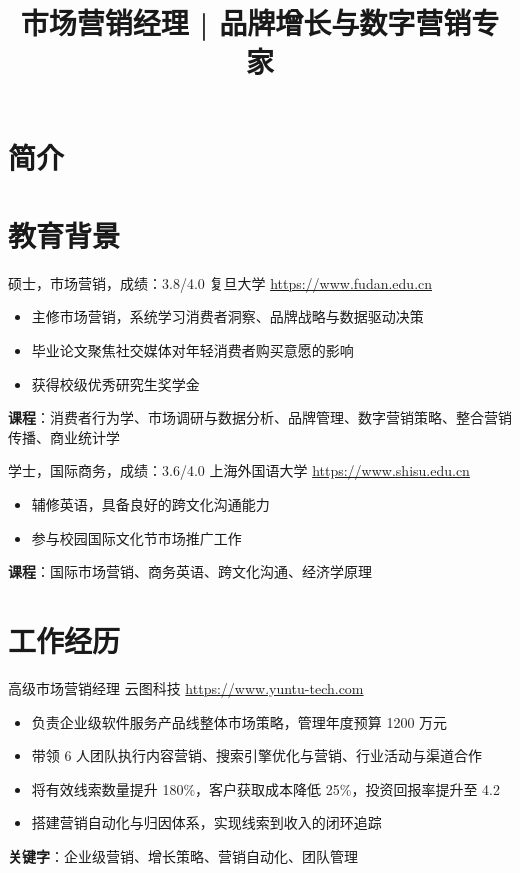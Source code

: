 \documentclass[a4paper, serif, 10pt]{moderncv}
\title{市场营销经理 | 品牌增长与数字营销专家}
\begin{document}
\maketitle

\section{简介}

\section{教育背景}

        {硕士，市场营销，成绩：3.8/4.0}
        {复旦大学}
        {\url{https://www.fudan.edu.cn}}
        {}
        {\begin{itemize}
\item 主修市场营销，系统学习消费者洞察、品牌战略与数据驱动决策
\item 毕业论文聚焦社交媒体对年轻消费者购买意愿的影响
\item 获得校级优秀研究生奖学金
\end{itemize}
\textbf{课程}：消费者行为学、市场调研与数据分析、品牌管理、数字营销策略、整合营销传播、商业统计学}

        {学士，国际商务，成绩：3.6/4.0}
        {上海外国语大学}
        {\url{https://www.shisu.edu.cn}}
        {}
        {\begin{itemize}
\item 辅修英语，具备良好的跨文化沟通能力
\item 参与校园国际文化节市场推广工作
\end{itemize}
\textbf{课程}：国际市场营销、商务英语、跨文化沟通、经济学原理}
\section{工作经历}

        {高级市场营销经理}
        {云图科技}
        {\url{https://www.yuntu-tech.com}}
        {}
        {\begin{itemize}
\item 负责企业级软件服务产品线整体市场策略，管理年度预算 1200 万元
\item 带领 6 人团队执行内容营销、搜索引擎优化与营销、行业活动与渠道合作
\item 将有效线索数量提升 180\%，客户获取成本降低 25\%，投资回报率提升至 4.2
\item 搭建营销自动化与归因体系，实现线索到收入的闭环追踪
\end{itemize}
\textbf{关键字}：企业级营销、增长策略、营销自动化、团队管理}
\end{document}
